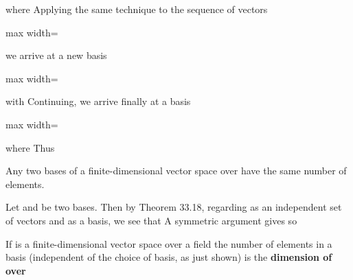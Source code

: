 \documentclass[11pt,oneside]{article}
\begin{document}
\begin{BookBody}
\noindent where  Applying the same technique to the sequence of vectors

\begin{center}\begin{adjustbox}{max width=\linewidth}\end{adjustbox}\end{center}

\noindent we arrive at a new basis

\begin{center}\begin{adjustbox}{max width=\linewidth}\end{adjustbox}\end{center}

\noindent with  Continuing, we arrive finally at a basis

\begin{center}\begin{adjustbox}{max width=\linewidth}\end{adjustbox}\end{center}

\noindent where  Thus  \BookEnd{\blacklozenge}

 Any two bases of a finite-dimensional vector space  over  have the same number of elements.

 Let  and  be two bases. Then by Theorem 33.18, regarding  as an independent set of vectors and  as a basis, we see that  A symmetric argument gives  so \BookEnd{\blacklozenge}

 If  is a finite-dimensional vector space over a field  the number of elements in a basis (independent of the choice of basis, as just shown) is the\textbf{ dimension of}  \textbf{over} \BookEnd{\blacksquare}


\end{BookBody}
\end{document}
